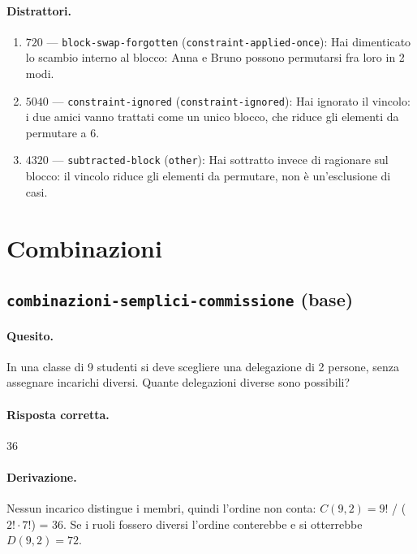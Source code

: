 \paragraph{Distrattori.}
\begin{enumerate}
  \item $720$ --- \texttt{block-swap-forgotten} (\texttt{constraint-applied-once}): Hai dimenticato lo scambio interno al blocco: Anna e Bruno possono permutarsi fra loro in 2 modi.
  \item $5040$ --- \texttt{constraint-ignored} (\texttt{constraint-ignored}): Hai ignorato il vincolo: i due amici vanno trattati come un unico blocco, che riduce gli elementi da permutare a 6.
  \item $4320$ --- \texttt{subtracted-block} (\texttt{other}): Hai sottratto invece di ragionare sul blocco: il vincolo riduce gli elementi da permutare, non è un'esclusione di casi.
\end{enumerate}

\section{Combinazioni}

\subsection{\texorpdfstring{\texttt{combinazioni-semplici-commissione} (base)}{combinazioni-semplici-commissione (base)}}

\paragraph{Quesito.} In una classe di 9 studenti si deve scegliere una delegazione di 2 persone, senza assegnare incarichi diversi. Quante delegazioni diverse sono possibili?

\paragraph{Risposta corretta.} $36$

\paragraph{Derivazione.} Nessun incarico distingue i membri, quindi l'ordine non conta: $C(9,2) = 9!$ / ($2! \cdot  7!$) = 36. Se i ruoli fossero diversi l'ordine conterebbe e si otterrebbe $D(9,2) = 72$.

